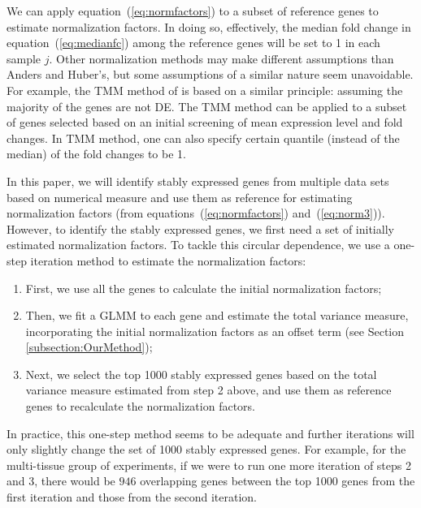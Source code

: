 \documentclass[letterpaper,12pt]{article}
\begin{document}
We can apply equation~(\ref{eq:normfactors}) to a subset of reference genes to
estimate normalization factors.  In doing so,  effectively, the median fold
change in equation~(\ref{eq:medianfc}) among the reference genes will be set
to 1 in each sample $j$.
Other normalization methods may make different assumptions
than Anders and Huber's, but some assumptions of a similar nature seem
unavoidable.  For example, the TMM method of \citet{robinson2010scaling} is
based on a similar principle: assuming the majority of the genes are not DE.
The TMM method can be applied to a subset of genes selected based on an
initial screening of mean expression level and fold changes. In TMM method,
one can also specify certain quantile (instead of the median) of the fold
changes to be 1.

In this paper, we will identify stably expressed genes from multiple data sets
based on numerical measure and use them as reference for estimating
normalization factors (from equations~(\ref{eq:normfactors}) and~(\ref{eq:norm3})). 
However, to identify the stably expressed genes, we first
need a set
of initially estimated normalization factors.  To tackle this circular
dependence, we use a one-step iteration method to estimate the normalization
factors: 
\begin{enumerate}
	\item
	First, we use all the genes to calculate the initial normalization factors; 
	\item
	Then, we fit a GLMM to each gene and estimate the total variance measure, incorporating the 
	initial normalization factors as
	an offset term (see Section \ref{subsection:OurMethod}); 
	\item
	Next, we select the top 1000 stably expressed genes based on the total
	variance measure estimated from step 2 above, and use them as
	reference genes to recalculate the normalization factors. 
\end{enumerate}
In practice, this one-step method seems to be adequate and further iterations
will only slightly change the set of 1000 stably expressed genes.  For
example, for the multi-tissue group of experiments, if we were to run one more
iteration of steps 2 and 3, there would be $946$ overlapping genes between
the top 1000 genes from the first iteration and those from the second
iteration.


\end{document}
